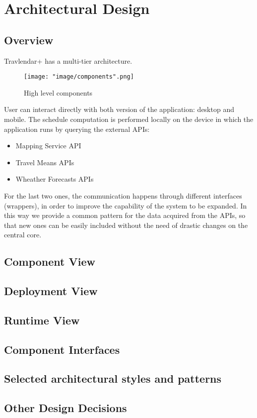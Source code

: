 \chapter{Architectural Design}

\section{Overview}
Travlendar+ has a multi-tier architecture.

\begin{figure}[H]
\begin{center}
\texttt{[image: "image/components".png]}
\caption{High level components}
\end{center}
\end{figure}

User can interact  directly with both version of the application: desktop and mobile. The schedule computation is performed locally on the device in which the application runs by querying the external APIs:

\begin{itemize}
\item Mapping Service API
\item Travel Means APIs
\item Wheather Forecasts APIs
\end{itemize}

For the last two ones, the communication happens through different interfaces (wrappers), in order to improve the capability of the system to be expanded. In this way we provide a common pattern for the data acquired from the APIs, so that new ones can be easily included without the need of drastic changes on the central core.

\section{Component View}

\section{Deployment View} 

\section{Runtime View}

\section{Component Interfaces}

\section{Selected architectural styles and patterns}

\section{Other Design Decisions}